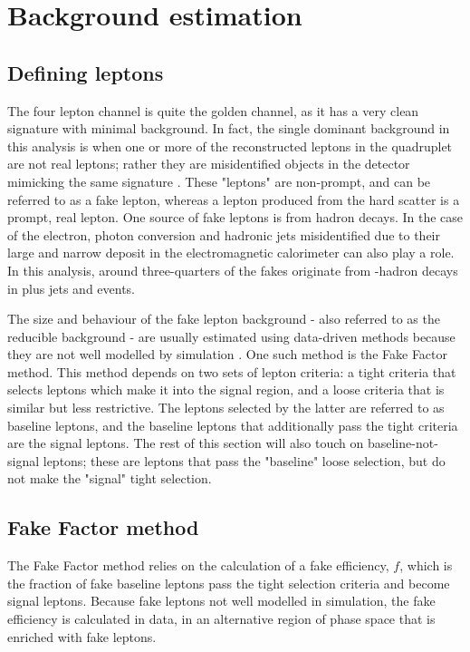 \section{Background estimation}
\label{sec:background}

\subsection{Defining leptons}

The four lepton channel is quite the golden channel, as it has a very clean signature with minimal background. In fact, the single dominant background in this analysis is when one or more of the reconstructed leptons in the quadruplet are not real leptons; rather they are misidentified objects in the detector mimicking the same signature \cite{varnes2016poisson}. These "leptons" are non-prompt, and can be referred to as a fake lepton, whereas a lepton produced from the hard scatter is a prompt, real lepton. One source of fake leptons is from hadron decays. In the case of the electron, photon conversion and hadronic jets misidentified due to their large and narrow deposit in the electromagnetic calorimeter can also play a role. In this analysis, around three-quarters of the fakes originate from \Pbottom-hadron decays in \Z plus jets and \Ptop\APtop events. 

The size and behaviour of the fake lepton background - also referred to as the reducible background - are usually estimated using data-driven methods because they are not well modelled by simulation \cite{varnes2016poisson}. One such method is the Fake Factor method. This method depends on two sets of lepton criteria: a tight criteria that selects leptons which make it into the signal region, and a loose criteria that is similar but less restrictive. The leptons selected by the latter are referred to as baseline leptons, and the baseline leptons that additionally pass the tight criteria are the signal leptons. The rest of this section will also touch on baseline-not-signal leptons; these are leptons that pass the "baseline" loose selection, but do not make the "signal" tight selection. 

\subsection{Fake Factor method}

The Fake Factor method relies on the calculation of a fake efficiency, $f$, which is the fraction of fake baseline leptons pass the tight selection criteria and become signal leptons. Because fake leptons not well modelled in simulation, the fake efficiency is calculated in data, in an alternative region of phase space that is enriched with fake leptons. 


